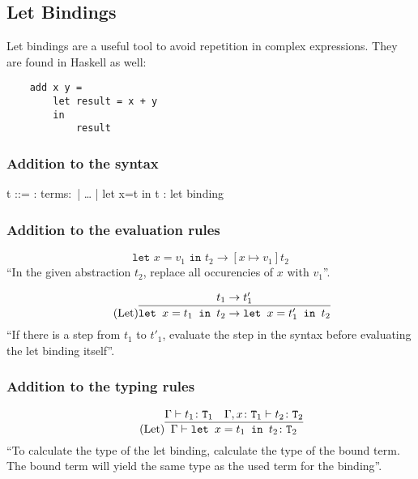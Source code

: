 \subsection{Let Bindings}
\label{subsec:let}

Let bindings are a useful tool to avoid repetition in complex expressions.
They are found in Haskell as well:

\begin{verbatim}
    add x y =
        let result = x + y
        in
            result
\end{verbatim}

\subsubsection{Addition to the syntax \cite{pierce2002ProgLang}}
\begin{bnfgrammar}
    t ::= : terms$\colon$
    | \dots
    | let x=t in t : let binding
\end{bnfgrammar}\leavevmode\newline

\subsubsection{Addition to the evaluation rules \cite{pierce2002ProgLang}}
\begin{equation*}
    \tag{Let-Bind Value}
    \texttt{let } x=v_1 \texttt{ in } t_2 \rightarrow [x \mapsto v_1] t_2
\end{equation*}
``In the given abstraction $t_2$, replace all occurencies of $x$ with $v_1$''.

\begin{equation*}
    \tag{Let}
    \infer{
        \texttt{let } x=t_1 \texttt{ in } t_2 \rightarrow \texttt{let } x=t'_1 \texttt{ in } t_2
    }{
        t_1 \rightarrow t'_1
    }
\end{equation*}
``If there is a step from $t_1$ to $t'_1$, evaluate the step
in the syntax before evaluating the let binding itself''.

\subsubsection{Addition to the typing rules \cite{pierce2002ProgLang}}
\begin{equation*}
    \tag{Let}
    \infer{
        \Gamma \vdash \texttt{let } x=t_1 \texttt{ in } t_2 \colon \texttt{T}_2
    }{
        \Gamma \vdash t_1 \colon \texttt{T}_1 & \Gamma , x \colon \texttt{T}_1 \vdash t_2 \colon \texttt{T}_2
    }
\end{equation*}
``To calculate the type of the let binding, calculate the type of the bound term. The bound
term will yield the same type as the used term for the binding''.

